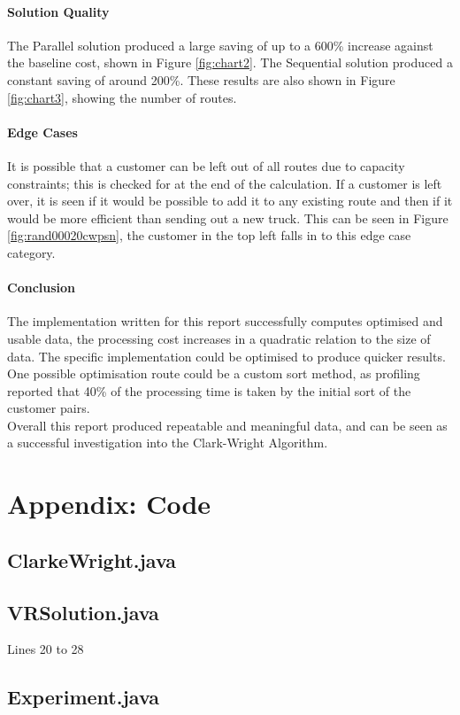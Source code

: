 \documentclass[conference]{acmsiggraph}
\begin{document}
\paragraph{Solution Quality}
The Parallel solution produced a large saving of up to a 600\% increase against the baseline cost, shown in Figure \ref{fig:chart2}. The Sequential solution produced a constant saving of around 200\%. These results are also shown in Figure \ref{fig:chart3}, showing the number of routes.

\paragraph{Edge Cases}
It is possible that a customer can be left out of all routes due to capacity constraints; this is checked for at the end of the calculation. If a customer is left over, it is seen if it would be possible to add it to any existing route and then if it would be more efficient than sending out a new truck. This can be seen in Figure \ref{fig:rand00020cwpsn}, the customer in the top left falls in to this edge case category.

\paragraph{Conclusion}
The implementation written for this report successfully computes optimised and usable data, the processing cost increases in a quadratic relation to the size of data. The specific implementation could be optimised to produce quicker results. One possible optimisation route could be a custom sort method, as profiling reported that 40\% of the processing time is taken by the initial sort of the customer pairs.\\
Overall this report produced repeatable and meaningful data, and can be seen as a successful investigation into the Clark-Wright Algorithm.


\clearpage

\section{Appendix: Code}
\subsection{ClarkeWright.java}
%

\vfill

\subsection{VRSolution.java}
Lines 20 to 28
%

\subsection{Experiment.java}
%
\end{document}

